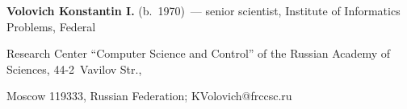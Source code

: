 \Contrl



\noindent

\textbf{Volovich Konstantin I.} (b.\ 1970)~--- senior scientist, Institute of Informatics Problems, Federal 

Research Center ``Computer Science and Control'' of the Russian Academy of Sciences, 44-2~Vavilov Str., 

Moscow 119333, Russian Federation; \mbox{KVolovich@frccsc.ru}





\label{end\stat}





\renewcommand{\bibname}{\protect\rm Литература}

